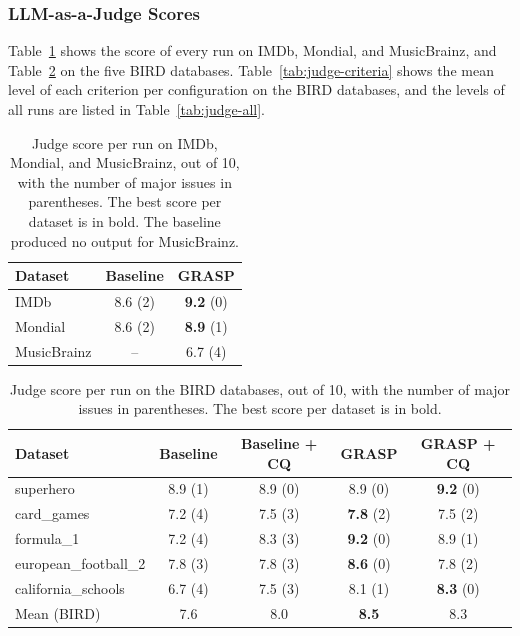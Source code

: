 \subsubsection{LLM-as-a-Judge Scores}\label{sec:results-judge}

Table~\ref{tab:judge-scores} shows the score of every run on IMDb, Mondial, and MusicBrainz, and Table~\ref{tab:judge-scores-bird} on the five BIRD databases. Table~\ref{tab:judge-criteria} shows the mean level of each criterion per configuration on the BIRD databases, and the levels of all runs are listed in Table~\ref{tab:judge-all}.

\begin{table}[!htbp]
  \centering
  \small
  \renewcommand{\arraystretch}{1.3}
  \begin{tabular}{l c c}
    \hline
    \textbf{Dataset} & \textbf{Baseline} & \textbf{GRASP} \\
    \hline
    IMDb                  & 8.6 (2) & \textbf{9.2} (0) \\
    Mondial               & 8.6 (2) & \textbf{8.9} (1) \\
    MusicBrainz           & --      & 6.7 (4) \\
    \hline
  \end{tabular}
  \caption[Judge scores on IMDb, Mondial, and MusicBrainz]{Judge score per run on IMDb, Mondial, and MusicBrainz, out of 10, with the number of major issues in parentheses. The best score per dataset is in bold. The baseline produced no output for MusicBrainz.}
  \label{tab:judge-scores}
\end{table}

\begin{table}[!htbp]
  \centering
  \small
  \renewcommand{\arraystretch}{1.3}
  \begin{tabular}{l c c c c}
    \hline
    \textbf{Dataset} & \textbf{Baseline} & \textbf{Baseline + CQ} & \textbf{GRASP} & \textbf{GRASP + CQ} \\
    \hline
    superhero            & 8.9 (1) & 8.9 (0) & 8.9 (0) & \textbf{9.2} (0) \\
    card\_games           & 7.2 (4) & 7.5 (3) & \textbf{7.8} (2) & 7.5 (2) \\
    formula\_1            & 7.2 (4) & 8.3 (3) & \textbf{9.2} (0) & 8.9 (1) \\
    european\_football\_2 & 7.8 (3) & 7.8 (3) & \textbf{8.6} (0) & 7.8 (2) \\
    california\_schools   & 6.7 (4) & 7.5 (3) & 8.1 (1) & \textbf{8.3} (0) \\
    \hline
    Mean (BIRD)           & 7.6     & 8.0     & \textbf{8.5}     & 8.3 \\
    \hline
  \end{tabular}
  \caption[Judge scores on the BIRD databases]{Judge score per run on the BIRD databases, out of 10, with the number of major issues in parentheses. The best score per dataset is in bold.}
  \label{tab:judge-scores-bird}
\end{table}

